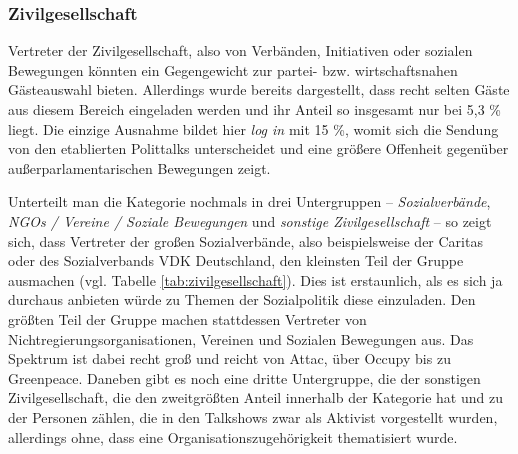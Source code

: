 \subsubsection{Zivilgesellschaft}

Vertreter der Zivilgesellschaft, also von Verbänden, Initiativen oder sozialen Bewegungen könnten ein Gegengewicht zur partei- bzw. wirtschaftsnahen Gästeauswahl bieten. Allerdings wurde bereits dargestellt, dass recht selten Gäste aus diesem Bereich eingeladen werden und ihr Anteil so insgesamt nur bei 5,3 \% liegt. Die einzige Ausnahme bildet hier \textit{log in} mit 15 \%, womit sich die Sendung von den etablierten Polittalks unterscheidet und eine größere Offenheit gegenüber außerparlamentarischen Bewegungen zeigt.

Unterteilt man die Kategorie nochmals in drei Untergruppen – \textit{Sozialverbände}, \textit{NGOs / Vereine / Soziale Bewegungen} und \textit{sonstige Zivilgesellschaft} – so zeigt sich, dass Vertreter der großen Sozialverbände, also beispielsweise der Caritas oder des Sozialverbands VDK Deutschland, den kleinsten Teil der Gruppe ausmachen (vgl. Tabelle \vref{tab:zivilgesellschaft}). Dies ist erstaunlich, als es sich ja durchaus anbieten würde zu Themen der Sozialpolitik diese einzuladen. Den größten Teil der Gruppe machen stattdessen Vertreter von Nichtregierungsorganisationen, Vereinen und Sozialen Bewegungen aus. Das Spektrum ist dabei recht groß und reicht von Attac, über Occupy bis zu Greenpeace. Daneben gibt es noch eine dritte Untergruppe, die der sonstigen Zivilgesellschaft, die den zweitgrößten Anteil innerhalb der Kategorie hat und zu der Personen zählen, die in den Talkshows zwar als Aktivist vorgestellt wurden, allerdings ohne, dass eine Organisationszugehörigkeit thematisiert wurde.

